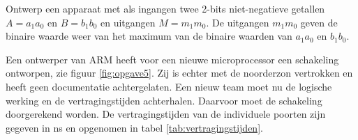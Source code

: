 \documentclass[a4paper,12pt,addpoints,fleqn,dutch]{tisdexam}
\begin{document}
\begin{questions}


\question
\label{opg:opg4}
Ontwerp een apparaat met als ingangen twee 2-bits niet-negatieve getallen
$A = a_{1}a_{0}$ en $B = b_{1}b_{0}$ en uitgangen $M = m_{1}m_{0}$. De
uitgangen $m_{1}m_{0}$ geven de binaire waarde weer van het maximum
van de binaire waarden van $a_{1}a_{0}$ en $b_{1}b_{0}$.



\question
\label{opg:opg5}
Een ontwerper van ARM heeft voor een nieuwe microprocessor een schakeling
ontworpen, zie figuur \ref{fig:opgave5}. Zij is echter met de noorderzon
vertrokken en heeft geen documentatie achtergelaten. Een nieuw team moet nu de
logische werking en de vertragingstijden achterhalen. Daarvoor moet de
schakeling doorgerekend worden. De vertragingstijden van de individuele
poorten zijn gegeven in ns en opgenomen in tabel \ref{tab:vertragingstijden}.


\end{questions}
\end{document}
